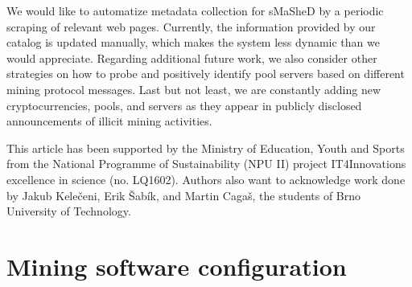 \documentclass[preprint,12pt,3p]{elsarticle}
\begin{document}
We would like to automatize metadata collection for sMaSheD by a periodic scraping of relevant web pages. Currently, the information provided by our catalog is updated manually, which makes the system less dynamic than we would appreciate. Regarding additional future work, we also consider other strategies on how to probe and positively identify pool servers based on different mining protocol messages. Last but not least, we are constantly adding new cryptocurrencies, pools, and servers as they appear in publicly disclosed announcements of illicit mining activities. 

This article has been supported by the Ministry of Education, Youth and Sports from the National Programme of Sustainability (NPU II) project IT4Innovations excellence in science (no.  LQ1602). 
Authors also want to acknowledge work done by Jakub Kelečeni, Erik Šabík, and Martin Cagaš, the students of Brno University of Technology.




% 
% 
% 
% 
% 
% 
% 
% 
% 
% 
% 
% 




\pagebreak
\appendix

\section{Mining software configuration}
\label{appendix-sec1}
\end{document}
